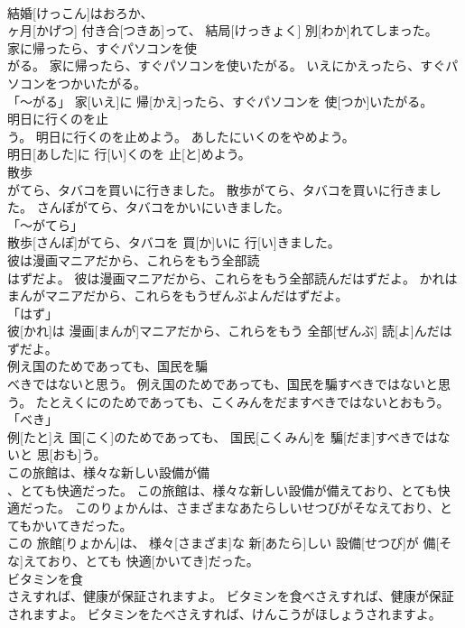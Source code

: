 \documentclass[8pt]{extreport}
\begin{document}
\begin{CJK}{UTF8}{min}
\\	結婚[けっこん]はおろか、 
\\	ヶ月[かげつ] 付き合[つきあ]って、 結局[けっきょく] 別[わか]れてしまった。		
\\	家に帰ったら、すぐパソコンを使
\\	がる。	家に帰ったら、すぐパソコンを使いたがる。	いえにかえったら、すぐパソコンをつかいたがる。	
\\	「～がる」	家[いえ]に 帰[かえ]ったら、すぐパソコンを 使[つか]いたがる。		
\\	明日に行くのを止
\\	う。	明日に行くのを止めよう。	あしたにいくのをやめよう。	
\\	明日[あした]に 行[い]くのを 止[と]めよう。		
\\	散歩
\\	がてら、タバコを買いに行きました。	散歩がてら、タバコを買いに行きました。	さんぽがてら、タバコをかいにいきました。	
\\	「～がてら」 
\\	散歩[さんぽ]がてら、タバコを 買[か]いに 行[い]きました。		
\\	彼は漫画マニアだから、これらをもう全部読
\\	はずだよ。	彼は漫画マニアだから、これらをもう全部読んだはずだよ。	かれはまんがマニアだから、これらをもうぜんぶよんだはずだよ。	
\\	「はず」 
\\	彼[かれ]は 漫画[まんが]マニアだから、これらをもう 全部[ぜんぶ] 読[よ]んだはずだよ。		
\\	例え国のためであっても、国民を騙
\\	べきではないと思う。	例え国のためであっても、国民を騙すべきではないと思う。	たとえくにのためであっても、こくみんをだますべきではないとおもう。	
\\	「べき」 
\\	例[たと]え 国[こく]のためであっても、 国民[こくみん]を 騙[だま]すべきではないと 思[おも]う。		
\\	この旅館は、様々な新しい設備が備
\\	、とても快適だった。	この旅館は、様々な新しい設備が備えており、とても快適だった。	このりょかんは、さまざまなあたらしいせつびがそなえており、とてもかいてきだった。	
\\	この 旅館[りょかん]は、 様々[さまざま]な 新[あたら]しい 設備[せつび]が 備[そな]えており、とても 快適[かいてき]だった。		
\\	ビタミンを食
\\	さえすれば、健康が保証されますよ。	ビタミンを食べさえすれば、健康が保証されますよ。	ビタミンをたべさえすれば、けんこうがほしょうされますよ。	

\end{CJK}
\end{document}
